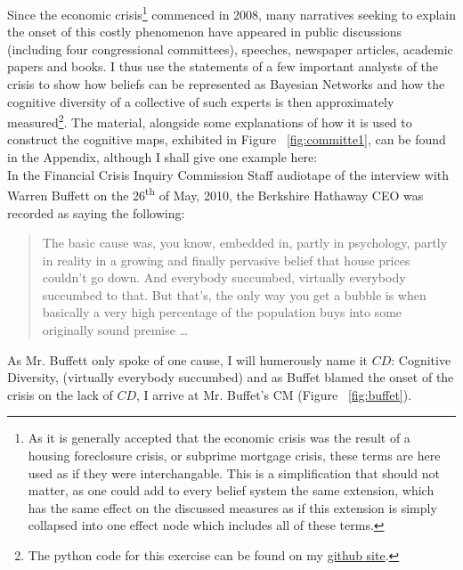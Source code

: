 \documentclass[12pt]{article}
\newcommand{\ts}{\textsuperscript}
\begin{document}
Since the economic crisis\footnote{As it is generally accepted that the economic crisis was the result of a housing foreclosure crisis, or subprime mortgage crisis, these terms are here used as if they were interchangable. This is a simplification that should not matter, as one could add to every belief system the same extension, which has the same effect on the discussed measures as if this extension is simply collapsed into one effect node which includes all of these terms.} commenced in 2008, many narratives seeking to explain the onset of this costly phenomenon have appeared in public discussions (including four congressional committees), speeches, newspaper articles, academic papers and books. I thus use the statements of a few important analysts of the crisis to show how beliefs can be represented as Bayesian Networks and how the cognitive diversity of a collective of such experts is then approximately measured\footnote{The python code for this exercise can be found on my \href{https://github.com/jac2130/DiversityMeasures/blob/master/BayesNets.py}{github site}.}. The material, alongside some explanations of how it is used to construct the cognitive maps, exhibited in Figure ~\ref{fig:committe1}, can be found in the Appendix, although I shall give one example here:
\\
In the Financial Crisis Inquiry Commission Staff audiotape of the interview with Warren Buffett on the 26\ts{th} of May, 2010, the Berkshire Hathaway CEO was recorded as saying the following:

\begin{quotation}
The basic cause was, you know, embedded in, partly in psychology, partly in reality in a growing and finally pervasive belief that house prices couldn't go down. And everybody succumbed, virtually everybody succumbed to that. But that's, the only way you get a bubble is when basically a very high percentage of the population buys into some originally sound premise \ldots
\end{quotation}

As Mr. Buffett only spoke of one cause, I will humerously name it $CD$: Cognitive Diversity, (virtually everybody succumbed) and as Buffet blamed the onset of the crisis on the lack of $CD$, I arrive at Mr. Buffet's CM (Figure ~\ref{fig:buffet}).
\end{document}

